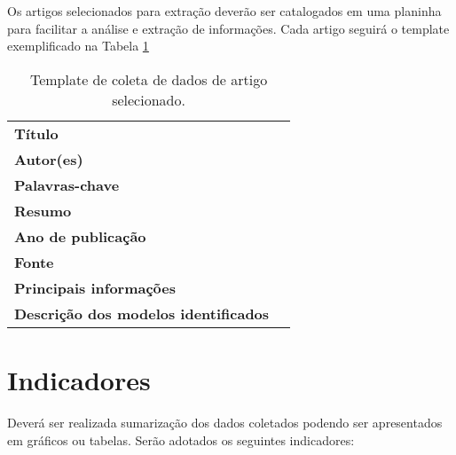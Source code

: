 Os artigos selecionados para extração deverão ser catalogados em uma planinha para facilitar a análise e extração de informações. Cada artigo seguirá o template exemplificado na Tabela \ref{tab:coleta_rs}

\begin{table}[h]
    \centering
    \small
 {\renewcommand\arraystretch{1.25}
 \caption{Template de coleta de dados de artigo selecionado.}
 \label{tab:coleta_rs}

 \begin{tabular}{ l l }
  \cline{1-1}\cline{2-2}  
    \multicolumn{1}{p{4.500cm}|}{\textbf{\small Título}} &
    \multicolumn{1}{p{6.400cm}}{ }
  \\  
  \cline{1-1}\cline{2-2}  
    \multicolumn{1}{p{4.500cm}|}{\textbf{Autor(es)}} &
    \multicolumn{1}{p{6.400cm}}{ }
  \\  
  \cline{1-1}\cline{2-2}  
    \multicolumn{1}{p{4.500cm}|}{\textbf{Palavras-chave}} &
    \multicolumn{1}{p{6.400cm}}{ }
  \\  
  \cline{1-1}\cline{2-2}  
    \multicolumn{1}{p{4.500cm}|}{\textbf{Resumo}} &
    \multicolumn{1}{p{6.400cm}}{ }
  \\  
  \cline{1-1}\cline{2-2}  
    \multicolumn{1}{p{4.500cm}|}{\textbf{Ano de publicação}} &
    \multicolumn{1}{p{6.400cm}}{ }
  \\  
  \cline{1-1}\cline{2-2}  
    \multicolumn{1}{p{4.500cm}|}{\textbf{Fonte}} &
    \multicolumn{1}{p{6.400cm}}{ }
  \\  
  \cline{1-1}\cline{2-2}  
    \multicolumn{1}{p{4.500cm}|}{\textbf{Principais informações}} &
    \multicolumn{1}{p{6.400cm}}{ }
  \\  
  \cline{1-1}\cline{2-2}  
    \multicolumn{1}{p{4.500cm}|}{\textbf{\small Descrição dos modelos identificados}} &
    \multicolumn{1}{p{6.400cm}}{ }
  \\  
  \hline

 \end{tabular} }
\end{table}

\section{Indicadores}

Deverá ser realizada sumarização dos dados coletados podendo ser apresentados em gráficos ou tabelas. Serão adotados os seguintes indicadores: 

